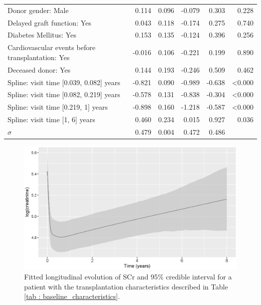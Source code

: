 \begin{table}[!htb]
\begin{center}
\begin{tabular}{lrrrrr}
Donor gender: Male                                                                      & 0.114  & 0.096    & -0.079 & 0.303  & 0.228          \\
Delayed graft function: Yes                                                                       & 0.043  & 0.118    & -0.174 & 0.275  & 0.740          \\
Diabetes Mellitus: Yes                                                                        & 0.153  & 0.135    & -0.124 & 0.396  & 0.256          \\
Cardiovascular events before transplantation: Yes                                                                     & -0.016 & 0.106    & -0.221 & 0.199  & 0.890          \\
Deceased donor: Yes                                                                  & 0.144  & 0.193    & -0.246 & 0.509  & 0.462          \\
Spline: visit time [0.039, 0.082] years & -0.821 & 0.090    & -0.989 & -0.638 & \textless0.000 \\
Spline: visit time [0.082, 0.219] years & -0.578 & 0.131    & -0.838 & -0.304 & \textless0.000 \\
Spline: visit time [0.219, 1] years & -0.898 & 0.160    & -1.218 & -0.587 & \textless0.000 \\
Spline: visit time [1, 6] years & 0.460  & 0.234    & 0.015  & 0.927  & 0.036          \\
$\sigma$                                                                            & 0.479  & 0.004    & 0.472  & 0.486  & \\
\hline
\end{tabular}
\end{center}
\end{table}

\begin{figure}[!htb]
\centerline{\includegraphics[width=\columnwidth]{images/creatinine.eps}}
\caption{Fitted longitudinal evolution of SCr and 95\% credible interval for a patient with the  transplantation characteristics described in Table \ref{tab : baseline_characteristics}.}
\label{fig : creatinine_evolution}
\end{figure}

